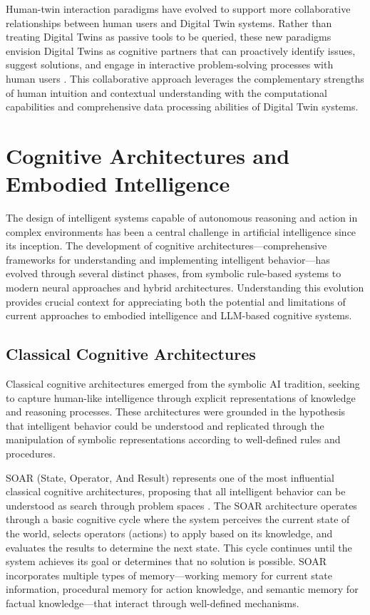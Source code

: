 Human-twin interaction paradigms have evolved to support more collaborative relationships between human users and Digital Twin systems. Rather than treating Digital Twins as passive tools to be queried, these new paradigms envision Digital Twins as cognitive partners that can proactively identify issues, suggest solutions, and engage in interactive problem-solving processes with human users \cite{sepasgozar2021digital}. This collaborative approach leverages the complementary strengths of human intuition and contextual understanding with the computational capabilities and comprehensive data processing abilities of Digital Twin systems.

\section{Cognitive Architectures and Embodied Intelligence}

The design of intelligent systems capable of autonomous reasoning and action in complex environments has been a central challenge in artificial intelligence since its inception. The development of cognitive architectures—comprehensive frameworks for understanding and implementing intelligent behavior—has evolved through several distinct phases, from symbolic rule-based systems to modern neural approaches and hybrid architectures. Understanding this evolution provides crucial context for appreciating both the potential and limitations of current approaches to embodied intelligence and LLM-based cognitive systems.

\subsection{Classical Cognitive Architectures}

Classical cognitive architectures emerged from the symbolic AI tradition, seeking to capture human-like intelligence through explicit representations of knowledge and reasoning processes. These architectures were grounded in the hypothesis that intelligent behavior could be understood and replicated through the manipulation of symbolic representations according to well-defined rules and procedures.

SOAR (State, Operator, And Result) represents one of the most influential classical cognitive architectures, proposing that all intelligent behavior can be understood as search through problem spaces \cite{laird2012soar}. The SOAR architecture operates through a basic cognitive cycle where the system perceives the current state of the world, selects operators (actions) to apply based on its knowledge, and evaluates the results to determine the next state. This cycle continues until the system achieves its goal or determines that no solution is possible. SOAR incorporates multiple types of memory—working memory for current state information, procedural memory for action knowledge, and semantic memory for factual knowledge—that interact through well-defined mechanisms.

